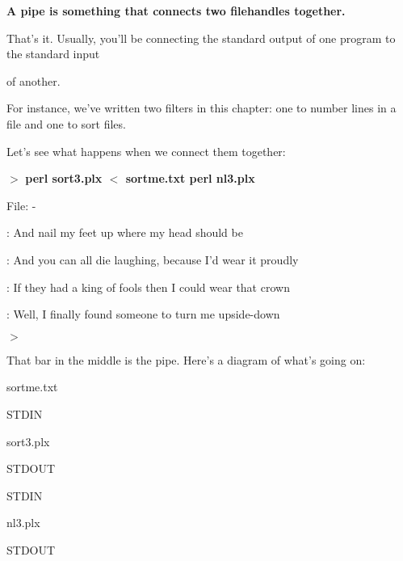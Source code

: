 \documentclass[a4paper,11pt]{book}
\begin{document}
\noindent 

\noindent 

\noindent \textbf{A pipe is something that connects two filehandles together.}

\noindent 

\noindent 

\noindent That's it.  Usually,  you'll be connecting  the  standard  output  of  one program  to  the standard  input

\noindent of another.

\noindent 

\noindent 

\noindent For instance, we've written two filters in this chapter: one to number lines in a file and one to sort files.

\noindent Let's see what happens when we connect them together:

\noindent 

\noindent $>$ \textbf{perl sort3.plx $<$ sortme.txt \textbar  perl nl3.plx}

\noindent 

\noindent File: -

\noindent 

: And nail my feet up where my head should be

: And you can all die laughing, because I'd wear it proudly

: If they had a king of fools then I could wear that crown

: Well, I finally found someone to turn me upside-down

\noindent $>$

\noindent 

\noindent That bar in the middle is the pipe. Here's a diagram of what's going on:

\noindent 

\noindent 

\noindent 

\noindent sortme.txt

\noindent STDIN

\noindent sort3.plx

\noindent STDOUT

\noindent STDIN

\noindent nl3.plx

\noindent STDOUT

\noindent 

\noindent 

\noindent 
\end{document}
